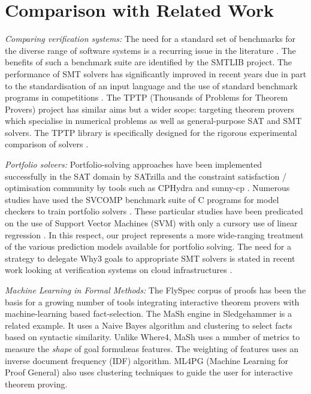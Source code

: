 \documentclass[submission,copyright,creativecommons]{eptcs}
\begin{document}
\section{Comparison with Related Work}
\label{sec:related}
\textit{Comparing verification systems:} The need for a standard set of benchmarks for the diverse range of software systems is a recurring issue in the literature \cite{Dagstuhl}. The benefits of such a benchmark suite are identified by the SMTLIB \cite{SMTLIB} project. The performance of SMT solvers has significantly improved in recent years due in part to the standardisation of an input language and the use of standard benchmark programs in  competitions \cite{SMTEVAL2013}\cite{SVCOMP}. The TPTP (Thousands of Problems for Theorem Provers) project \cite{TPTP} has similar aims but a wider scope: targeting theorem provers which specialise in numerical problems as well as general-purpose SAT and SMT solvers. The TPTP library is specifically designed for the rigorous experimental comparison of solvers \cite{Sutcliffe200139}.           

\textit{Portfolio solvers:} Portfolio-solving approaches have been implemented successfully in the SAT domain by SATzilla \cite{Satzilla} and the constraint satisfaction / optimisation community by tools such as CPHydra \cite{CPHydra} and sunny-cp \cite{sunny-cp}. Numerous studies have used the SVCOMP \cite{SVCOMP} benchmark suite of C programs for model checkers to train portfolio solvers \cite{MUX}\cite{DPVZ15:CAV}. These particular studies have been predicated on the use of Support Vector Machines (SVM) with only a cursory use of linear regression \cite{MUX}. In this respect, our project represents a more wide-ranging treatment of the various prediction models available for portfolio solving. The need for a strategy to delegate \textsf{Why3} goals to appropriate SMT solvers is stated in recent work looking at verification systems on cloud infrastructures \cite{rodinplugin}.

\textit{Machine Learning in Formal Methods:} 
The FlySpec \cite{Flyspec} corpus of proofs has been the basis for a growing number of tools integrating interactive theorem provers with machine-learning based fact-selection. The MaSh engine in Sledgehammer \cite{Sledgehammer} is a related example. It uses a Naive Bayes algorithm and clustering to select facts based on syntactic similarity. 
Unlike \textsf{Where4}, MaSh uses a number of metrics to measure the \textit{shape} of goal formul\ae as features. 
The weighting of features uses an inverse document frequency (IDF) algorithm.
ML4PG (Machine Learning for Proof General) \cite{ML4PG} also uses clustering techniques to guide the user for interactive theorem proving.
\end{document}
